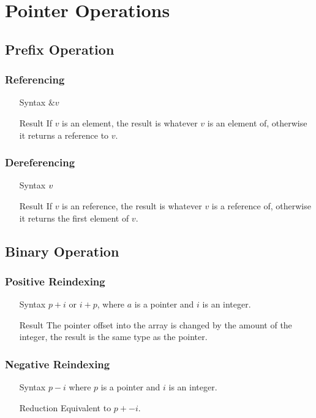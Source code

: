 \section{Pointer Operations}
\subsection{Prefix Operation}
\subsubsection{Referencing}
\begin{itemize}
\item[Syntax] $\&v$
\item[Result] If $v$ is an element, the result is whatever $v$ is an element of, otherwise it returns a reference to $v$.
\end{itemize}
\subsubsection{Dereferencing}
\begin{itemize}
\item[Syntax] $\*v$
\item[Result] If $v$ is an reference, the result is whatever $v$ is a reference of, otherwise it returns the first element of $v$.
\end{itemize}
\subsection{Binary Operation}
\subsubsection{Positive Reindexing}
\begin{itemize}
\item[Syntax] $p + i$ or $i + p$, where $a$ is a pointer and $i$ is an integer.
\item[Result] The pointer offset into the array is changed by the amount of the integer, the result is the same type as the pointer.
\end{itemize}
\subsubsection{Negative Reindexing}
\begin{itemize}
\item[Syntax] $p - i$ where $p$ is a pointer and $i$ is an integer.
\item[Reduction] Equivalent to $p + -i$.
\end{itemize}
